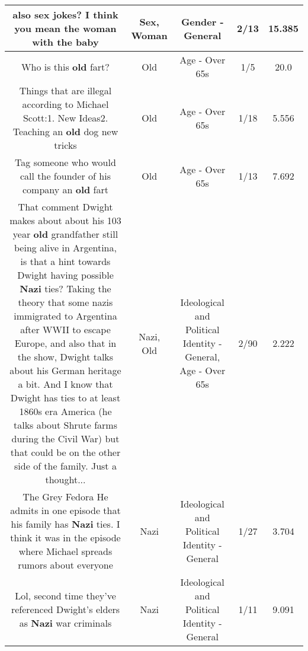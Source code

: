 \documentclass[11pt]{article}
\newlength\mylength
\begin{document}
\begin{center}
\begin{longtable}{|C{.65\mylength}|C{.30\mylength}|C{.12\mylength}|C{.12\mylength}|C{.12\mylength}|}
  \small {} also \textbf{sex} jokes? I think you mean the \textbf{woman} with the baby\normalsize   & Sex, Woman & Gender - General & 2/13 & 15.385 \\  \hline
  \small Who is this \textbf{old} fart?\normalsize   & Old & Age - Over 65s & 1/5 & 20.0 \\  \hline
  \small Things that are illegal according to Michael Scott:1. New Ideas2. Teaching an \textbf{old} dog new tricks\normalsize   & Old & Age - Over 65s & 1/18 & 5.556 \\  \hline
  \small Tag someone who would call the founder of his company an \textbf{old} fart\normalsize   & Old & Age - Over 65s & 1/13 & 7.692 \\  \hline
  \small That comment Dwight makes about about his 103 year \textbf{old} grandfather still being alive in Argentina, is that a hint towards Dwight having possible \textbf{Nazi} ties?  Taking the theory that some nazis immigrated to Argentina after WWII to escape Europe, and also that in the show, Dwight talks about his German heritage a bit.  And I know that Dwight has ties to at least 1860s era America (he talks about Shrute farms during the Civil War) but that could be on the other side of the family.  Just a thought...\normalsize   & Nazi, Old &  Ideological and Political Identity - General, Age - Over 65s & 2/90 & 2.222 \\  \hline
  \small The Grey Fedora He admits in one episode that his family has \textbf{Nazi} ties. I think it was in the episode where Michael spreads rumors about everyone\normalsize   & Nazi &  Ideological and Political Identity - General & 1/27 & 3.704 \\  \hline
  \small Lol, second time they've referenced Dwight's elders as \textbf{Nazi} war criminals\normalsize   & Nazi &  Ideological and Political Identity - General & 1/11 & 9.091 \\  \hline

\end{longtable}
\end{center}
\end{document}
